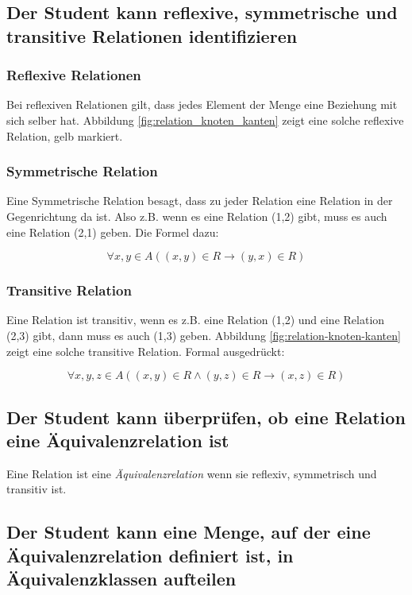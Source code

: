 \subsection{Der Student kann reflexive, symmetrische und transitive Relationen identifizieren}

\subsubsection{Reflexive Relationen}
Bei reflexiven Relationen gilt, dass jedes Element der Menge eine Beziehung mit sich selber hat. Abbildung \ref{fig:relation_knoten_kanten} zeigt eine solche reflexive Relation, gelb markiert.

\subsubsection{Symmetrische Relation}
Eine Symmetrische Relation besagt, dass zu jeder Relation eine Relation in der Gegenrichtung da ist. Also z.B. wenn es eine Relation (1,2) gibt, muss es auch eine Relation (2,1) geben. Die Formel dazu:

\begin{equation*}
    \forall x,y \in A ((x,y) \in R \to (y,x) \in R)
\end{equation*}

\subsubsection{Transitive Relation}
Eine Relation ist transitiv, wenn es z.B. eine Relation (1,2) und eine Relation (2,3) gibt, dann muss es auch (1,3) geben. Abbildung \ref{fig:relation-knoten-kanten} zeigt eine solche transitive Relation. Formal ausgedrückt:

\begin{equation*}
  \forall x,y,z \in A ((x,y) \in R \wedge (y,z) \in R \to (x,z) \in R)
\end{equation*}


\subsection{Der Student kann überprüfen, ob eine Relation eine Äquivalenzrelation ist}
Eine Relation ist eine \emph{Äquivalenzrelation} wenn sie reflexiv, symmetrisch und transitiv ist.

\subsection{Der Student kann eine Menge, auf der eine Äquivalenzrelation definiert ist, in Äquivalenzklassen aufteilen}

